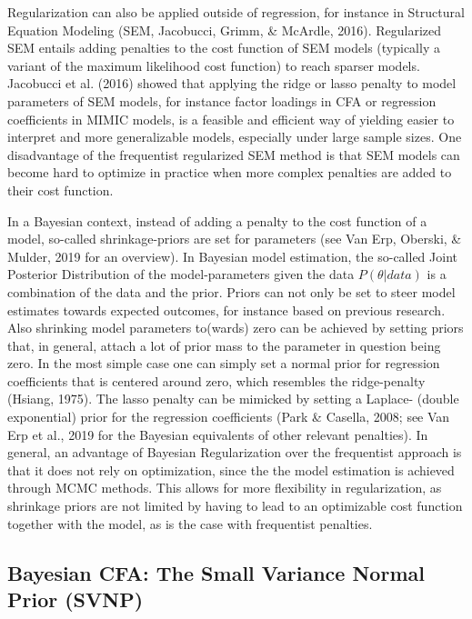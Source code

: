 \documentclass[
  man, donotrepeattitle,floatsintext]{apa6}
\begin{document}
Regularization can also be applied outside of regression, for instance in Structural Equation Modeling (SEM, Jacobucci, Grimm, \& McArdle, 2016). Regularized SEM entails adding penalties to the cost function of SEM models (typically a variant of the maximum likelihood cost function) to reach sparser models. Jacobucci et al. (2016) showed that applying the ridge or lasso penalty to model parameters of SEM models, for instance factor loadings in CFA or regression coefficients in MIMIC models, is a feasible and efficient way of yielding easier to interpret and more generalizable models, especially under large sample sizes. One disadvantage of the frequentist regularized SEM method is that SEM models can become hard to optimize in practice when more complex penalties are added to their cost function.

In a Bayesian context, instead of adding a penalty to the cost function of a model, so-called shrinkage-priors are set for parameters (see Van Erp, Oberski, \& Mulder, 2019 for an overview). In Bayesian model estimation, the so-called Joint Posterior Distribution of the model-parameters given the data \(P({\theta} | data)\) is a combination of the data and the prior. Priors can not only be set to steer model estimates towards expected outcomes, for instance based on previous research. Also shrinking model parameters to(wards) zero can be achieved by setting priors that, in general, attach a lot of prior mass to the parameter in question being zero. In the most simple case one can simply set a normal prior for regression coefficients that is centered around zero, which resembles the ridge-penalty (Hsiang, 1975). The lasso penalty can be mimicked by setting a Laplace- (double exponential) prior for the regression coefficients (Park \& Casella, 2008; see Van Erp et al., 2019 for the Bayesian equivalents of other relevant penalties). In general, an advantage of Bayesian Regularization over the frequentist approach is that it does not rely on optimization, since the the model estimation is achieved through MCMC methods. This allows for more flexibility in regularization, as shrinkage priors are not limited by having to lead to an optimizable cost function together with the model, as is the case with frequentist penalties.

\hypertarget{bayesian-cfa-the-small-variance-normal-prior-svnp}{%
\subsection{Bayesian CFA: The Small Variance Normal Prior (SVNP)}\label{bayesian-cfa-the-small-variance-normal-prior-svnp}}
\end{document}
